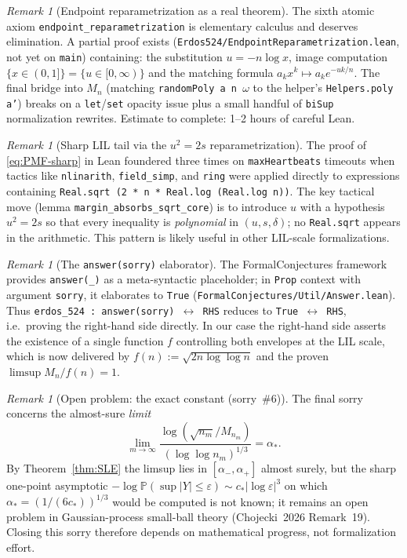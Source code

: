 \documentclass[11pt]{article}
\theoremstyle{plain}
\theoremstyle{definition}
\theoremstyle{remark}
\newtheorem{remark}[theorem]{Remark}
\newcommand{\PP}{\mathbb{P}}
\newcommand{\supnorm}{M}
\newcommand{\eps}{\varepsilon}
\begin{document}
\begin{remark}[Endpoint reparametrization as a real theorem]
The sixth atomic axiom \texttt{endpoint\_reparametrization} is
elementary calculus and deserves elimination. A partial proof exists
(\texttt{Erdos524/EndpointReparametrization.lean}, not yet on
\texttt{main}) containing: the substitution
$u = -n\log x$, image computation $\{x\in(0,1]\} = \{u\in[0,\infty)\}$
and the matching formula
$a_k x^k \mapsto a_k e^{-uk/n}$. The final bridge into
$\supnorm_n$ (matching \texttt{randomPoly a n \(\omega\)} to the helper's
\texttt{Helpers.poly a'}) breaks on a \texttt{let}/\texttt{set}
opacity issue plus a small handful of \texttt{biSup} normalization
rewrites. Estimate to complete: 1--2 hours of careful Lean.
\end{remark}

\begin{remark}[Sharp LIL tail via the $u^2 = 2s$ reparametrization]
The proof of \eqref{eq:PMF-sharp} in Lean foundered three times on
\texttt{maxHeartbeats} timeouts when tactics like \texttt{nlinarith},
\texttt{field\_simp}, and \texttt{ring} were applied directly to
expressions containing \texttt{Real.sqrt (2 * n * Real.log (Real.log n))}.
The key tactical move (lemma \texttt{margin\_absorbs\_sqrt\_core}) is to
introduce $u$ with a hypothesis $u^2 = 2s$ so that every inequality is
\emph{polynomial} in $(u, s, \delta)$; no \texttt{Real.sqrt} appears in
the arithmetic. This pattern is likely useful in other LIL-scale
formalizations.
\end{remark}

\begin{remark}[The \texttt{answer(sorry)} elaborator]
The FormalConjectures framework provides \texttt{answer(\_)} as a
meta-syntactic placeholder; in \texttt{Prop} context with argument
\texttt{sorry}, it elaborates to \texttt{True}
(\texttt{FormalConjectures/Util/Answer.lean}). Thus
\texttt{erdos\_524 : answer(sorry) $\leftrightarrow$ RHS} reduces to
\texttt{True $\leftrightarrow$ RHS}, i.e.\ proving the right-hand side
directly. In our case the right-hand side asserts the existence of a
single function $f$ controlling both envelopes at the LIL scale, which
is now delivered by $f(n) := \sqrt{2n\log\log n}$ and the proven
$\limsup \supnorm_n/f(n) = 1$.
\end{remark}

\begin{remark}[Open problem: the exact constant (sorry~\#6)]
The final sorry concerns the almost-sure \emph{limit}
\[
  \lim_{m\to\infty}
    \frac{\log(\sqrt{n_m}/\supnorm_{n_m})}{(\log\log n_m)^{1/3}} = \alpha_*.
\]
By Theorem~\ref{thm:SLE} the limsup lies in $[\alpha_-,\alpha_+]$ almost
surely, but the sharp one-point asymptotic
$-\log\PP(\sup|Y|\le\eps) \sim c_*|\log\eps|^3$ on which
$\alpha_* = (1/(6c_*))^{1/3}$ would be computed is not known; it
remains an open problem in Gaussian-process small-ball theory
(Chojecki~2026 Remark~19). Closing this sorry therefore depends on
mathematical progress, not formalization effort.
\end{remark}
\end{document}
